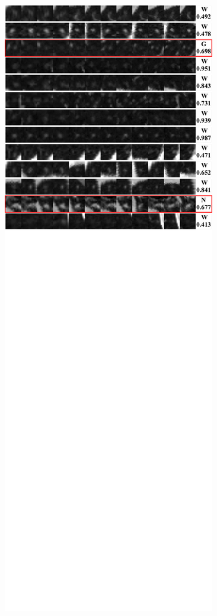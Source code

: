 \documentclass[onecolumn]{IEEEtran}
\begin{document}
\begin{figure}[H]
{\includegraphics[width=0.45\columnwidth]{./images/elcap-msnodules-iso3}
}
\end{figure}

\newpage
\end{document}
